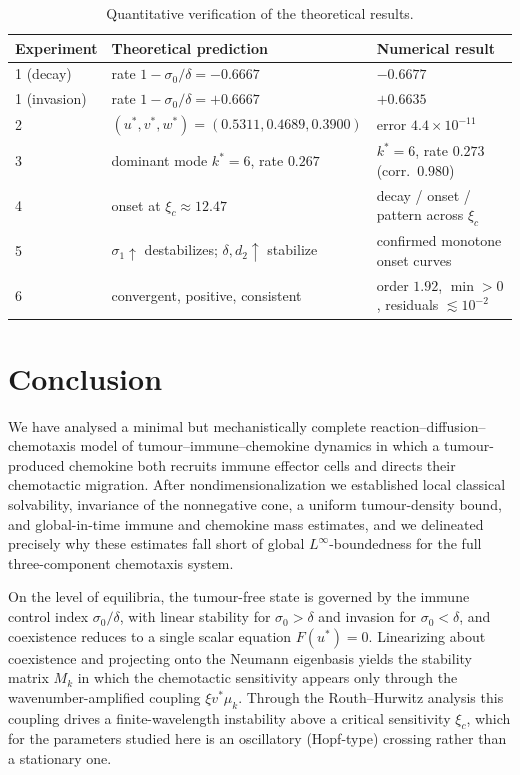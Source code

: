 \documentclass[a4paper,fleqn,longmktitle]{cas-sc}
\theoremstyle{plain}
\theoremstyle{definition}
\numberwithin{equation}{section}
\begin{document}
\begin{table}[htbp]
\centering
\caption{Quantitative verification of the theoretical results.}
\label{tab:verification-summary}
\begin{tabular}{lll}
\toprule
Experiment & Theoretical prediction & Numerical result \\
\midrule
1 (decay) & rate $1-\sigma_0/\delta=-0.6667$ & $-0.6677$ \\
1 (invasion) & rate $1-\sigma_0/\delta=+0.6667$ & $+0.6635$ \\
2 & $(u^*,v^*,w^*)=(0.5311,0.4689,0.3900)$ & error $4.4\times10^{-11}$ \\
3 & dominant mode $k^*=6$, rate $0.267$ & $k^*=6$, rate $0.273$ (corr.\ $0.980$) \\
4 & onset at $\xi_c\approx12.47$ & decay / onset / pattern across $\xi_c$ \\
5 & $\sigma_1\uparrow$ destabilizes; $\delta,d_2\uparrow$ stabilize & confirmed monotone onset curves \\
6 & convergent, positive, consistent & order $1.92$, $\min>0$, residuals $\lesssim10^{-2}$ \\
\bottomrule
\end{tabular}
\end{table}

\section{Conclusion}
\label{sec:conclusion}

We have analysed a minimal but mechanistically complete
reaction--diffusion--chemotaxis model of tumour--immune--chemokine dynamics in
which a tumour-produced chemokine both recruits immune effector cells and directs
their chemotactic migration. After nondimensionalization we established local
classical solvability, invariance of the nonnegative cone, a uniform
tumour-density bound, and global-in-time immune and chemokine mass estimates,
and we delineated precisely why these estimates fall short of global
$L^\infty$-boundedness for the full three-component chemotaxis system.

On the level of equilibria, the tumour-free state is governed by the immune
control index $\sigma_0/\delta$, with linear stability for $\sigma_0>\delta$ and
invasion for $\sigma_0<\delta$, and coexistence reduces to a single scalar
equation $F(u^*)=0$. Linearizing about coexistence and projecting onto the
Neumann eigenbasis yields the stability matrix $M_k$ in which the chemotactic
sensitivity appears only through the wavenumber-amplified coupling
$\xi v^*\mu_k$. Through the Routh--Hurwitz analysis this coupling drives a
finite-wavelength instability above a critical sensitivity $\xi_c$, which for the
parameters studied here is an oscillatory (Hopf-type) crossing rather than a
stationary one.
\end{document}
